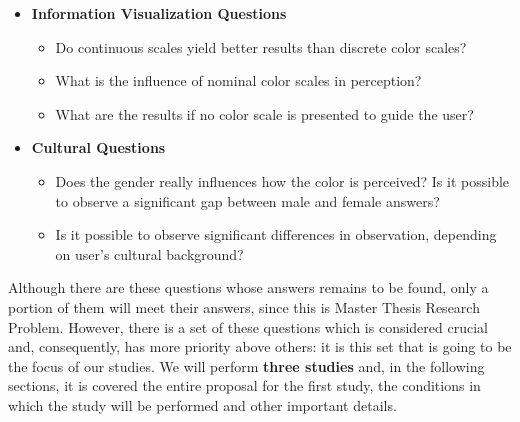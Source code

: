 \documentclass{report}
\begin{document}
\begin{itemize}
    \newpage
    \item \textbf{Information Visualization Questions}
    \begin{itemize}
    	\setlength\itemsep{0.1em}
		\item Do continuous scales yield better results than discrete color scales?
        \item What is the influence of nominal color scales in perception?
        \item What are the results if no color scale is presented to guide the user?
	\end{itemize}
    \item \textbf{Cultural Questions}
    \begin{itemize}
    	\setlength\itemsep{0.1em}
		\item Does the gender really influences how the color is perceived? Is it possible to observe a significant gap between male and female answers?
\item Is it possible to observe significant differences in observation, depending on user's cultural background?
	\end{itemize}
\end{itemize} \par
%
Although there are these questions whose answers remains to be found, only a portion of them will meet their answers, since this is Master Thesis Research Problem. However, there is a set of these questions which is considered crucial and, consequently, has more priority above others: it is this set that is going to be the focus of our studies. We will perform \textbf{three studies} and, in the following sections, it is covered the entire proposal for the first study, the conditions in which the study will be performed and other important details.
%
\end{document}
